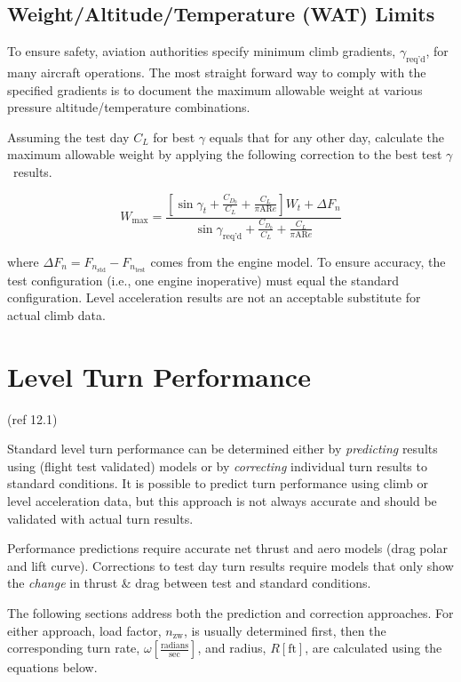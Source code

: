 \documentclass[
]{book}
\begin{document}
\hypertarget{weightaltitudetemperature-wat-limits}{%
\subsection{Weight/Altitude/Temperature (WAT) Limits}\label{weightaltitudetemperature-wat-limits}}

To ensure safety, aviation authorities specify minimum climb gradients,
\(\gamma_{\text{req'd}}\), for many aircraft operations. The most straight
forward way to comply with the specified gradients is to document the maximum
allowable weight at various pressure altitude/temperature combinations.

Assuming the test day \(C_L\) for best \(\gamma\) equals that for any other day,
calculate the maximum allowable weight by applying the following correction to
the best test \(\gamma\)~results.

\[
W_{\text{max}} = \frac{ \left[  \sin \gamma_t + \frac{C_{D_0}}{C_L} + \frac{C_L}{\pi \mathrm{AR} e} \right] W_t + \Delta F_n}{ \sin \gamma_{\text{req'd}} + \frac{C_{D_0}}{C_L} + \frac{C_L}{\pi \mathrm{AR} e}  }
\]

where \(\Delta F_n = F_{n_{\text{std}}} - F_{n_{\text{test}}}\) comes from the
engine model. To ensure accuracy, the test configuration (i.e., one engine
inoperative) must equal the standard configuration. Level acceleration results
are not an acceptable substitute for actual climb data.~

\hypertarget{level-turn-performance}{%
\section{Level Turn Performance}\label{level-turn-performance}}

(ref 12.1)

Standard level turn performance can be determined either by \emph{predicting} results
using (flight test validated) models or by \emph{correcting} individual turn results
to standard conditions. It is possible to predict turn performance using climb
or level acceleration data, but this approach is not always accurate and should
be validated with actual turn results.

Performance predictions require accurate net thrust and aero models (drag polar
and lift curve). Corrections to test day turn results require models that only
show the \emph{change} in thrust \& drag between test and standard conditions.

The following sections address both the prediction and correction approaches.
For either approach, load factor, \(n_{\text{zw}}\), is usually determined first,
then the corresponding turn rate, \(\omega \left[ \frac{\text{radians}}{\text{sec}} \right]\),
and radius, \(R \left[ \text{ft} \right]\), are calculated using the equations
below.
\end{document}

